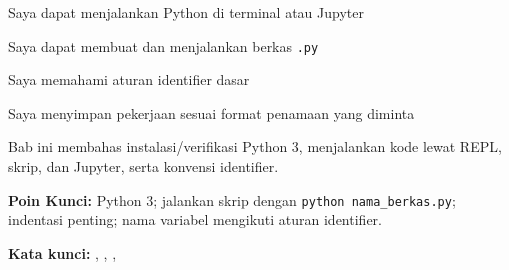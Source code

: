 \documentclass[../main.tex]{subfiles}
\begin{document}
\begin{checklist}
  \item Saya dapat menjalankan Python di terminal atau Jupyter
  \item Saya dapat membuat dan menjalankan berkas \texttt{.py}
  \item Saya memahami aturan identifier dasar
  \item Saya menyimpan pekerjaan sesuai format penamaan yang diminta
\end{checklist}

\begin{rangkuman}
Bab ini membahas instalasi/verifikasi Python 3, menjalankan kode lewat REPL, skrip, dan Jupyter, serta konvensi identifier.

\textbf{Poin Kunci:} Python 3; jalankan skrip dengan \texttt{python nama\_berkas.py}; indentasi penting; nama variabel mengikuti aturan identifier.

\textbf{Kata kunci:} , , , 
\end{rangkuman}
\end{document}
